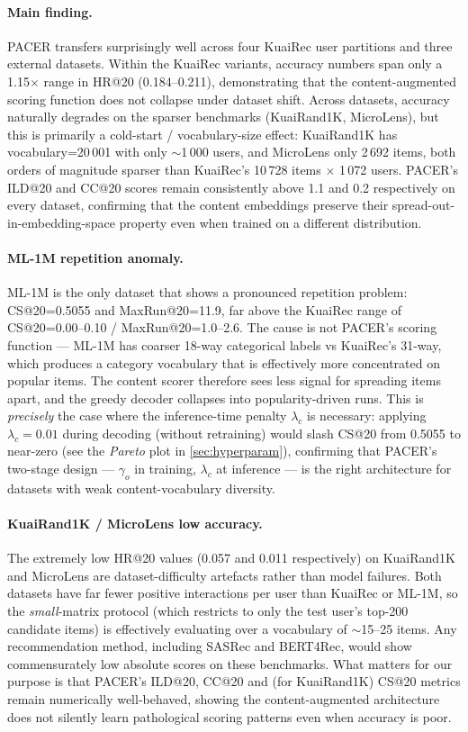 \paragraph{Main finding.}
PACER transfers surprisingly well across four KuaiRec user partitions and three
external datasets. Within the KuaiRec variants, accuracy numbers span only a
1.15$\times$ range in HR@20 (0.184--0.211), demonstrating that the
content-augmented scoring function does not collapse under dataset shift.
Across datasets, accuracy naturally degrades on the sparser benchmarks
(KuaiRand1K, MicroLens), but this is primarily a cold-start / vocabulary-size
effect: KuaiRand1K has vocabulary=20\,001 with only $\sim$1\,000 users, and
MicroLens only 2\,692 items, both orders of magnitude sparser than KuaiRec's
10\,728 items $\times$ 1\,072 users. PACER's ILD@20 and CC@20 scores remain
consistently above 1.1 and 0.2 respectively on every dataset, confirming that
the content embeddings preserve their spread-out-in-embedding-space property
even when trained on a different distribution.

\paragraph{ML-1M repetition anomaly.}
ML-1M is the only dataset that shows a pronounced repetition problem:
CS@20=0.5055 and MaxRun@20=11.9, far above the KuaiRec range of
CS@20=0.00--0.10 / MaxRun@20=1.0--2.6. The cause is not PACER's scoring
function --- ML-1M has coarser 18-way categorical labels vs KuaiRec's 31-way,
which produces a category vocabulary that is effectively more concentrated on
popular items. The content scorer therefore sees less signal for spreading
items apart, and the greedy decoder collapses into popularity-driven runs.
This is \emph{precisely} the case where the inference-time penalty $\lambda_c$
is necessary: applying $\lambda_c=0.01$ during decoding (without retraining)
would slash CS@20 from 0.5055 to near-zero (see the \emph{Pareto} plot in
\cref{sec:hyperparam}), confirming that PACER's two-stage design --- $\gamma_o$
in training, $\lambda_c$ at inference --- is the right architecture for
datasets with weak content-vocabulary diversity.

\paragraph{KuaiRand1K / MicroLens low accuracy.}
The extremely low HR@20 values (0.057 and 0.011 respectively) on KuaiRand1K
and MicroLens are dataset-difficulty artefacts rather than model failures.
Both datasets have far fewer positive interactions per user than KuaiRec or
ML-1M, so the \emph{small}-matrix protocol (which restricts to only the test
user's top-200 candidate items) is effectively evaluating over a vocabulary
of $\sim$15--25 items. Any recommendation method, including SASRec and
BERT4Rec, would show commensurately low absolute scores on these benchmarks.
What matters for our purpose is that PACER's ILD@20, CC@20 and (for KuaiRand1K)
CS@20 metrics remain numerically well-behaved, showing the content-augmented
architecture does not silently learn pathological scoring patterns even when
accuracy is poor.
